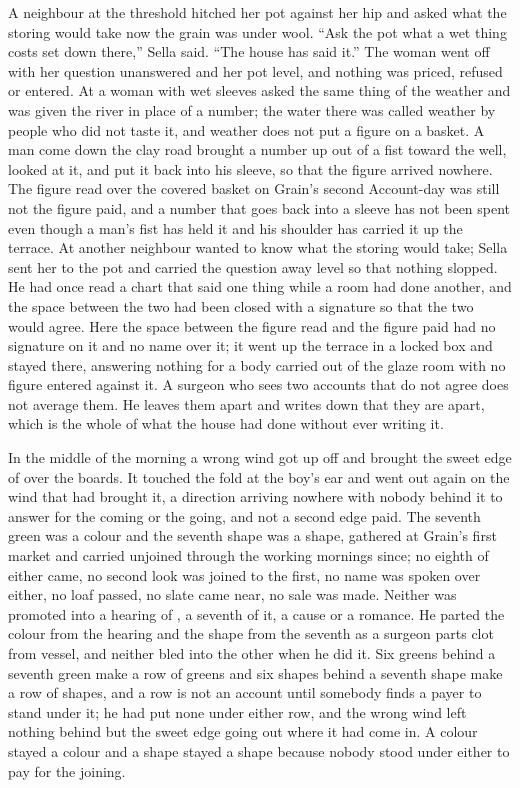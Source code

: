 A neighbour at the threshold hitched her pot against her hip and asked what the storing would take now the grain was under wool. “Ask the pot what a wet thing costs set down there,” Sella said. “The house has said it.” The woman went off with her question unanswered and her pot level, and nothing was priced, refused or entered. At  a woman with wet sleeves asked the same thing of the weather and was given the river in place of a number; the water there was called weather by people who did not taste it, and weather does not put a figure on a basket. A man come down the clay road brought a number up out of a fist toward the well, looked at it, and put it back into his sleeve, so that the figure arrived nowhere. The figure read over the covered basket on Grain's second Account-day was still not the figure paid, and a number that goes back into a sleeve has not been spent even though a man's fist has held it and his shoulder has carried it up the terrace. At  another neighbour wanted to know what the storing would take; Sella sent her to the pot and carried the question away level so that nothing slopped. He had once read a chart that said one thing while a room had done another, and the space between the two had been closed with a signature so that the two would agree. Here the space between the figure read and the figure paid had no signature on it and no name over it; it went up the terrace in a locked box and stayed there, answering nothing for a body carried out of the glaze room with no figure entered against it. A surgeon who sees two accounts that do not agree does not average them. He leaves them apart and writes down that they are apart, which is the whole of what the house had done without ever writing it.

In the middle of the morning a wrong wind got up off  and brought the sweet edge of  over the boards. It touched the fold at the boy's ear and went out again on the wind that had brought it, a direction arriving nowhere with nobody behind it to answer for the coming or the going, and not a second edge paid. The seventh green was a colour and the seventh shape was a shape, gathered at Grain's first market and carried unjoined through the working mornings since; no eighth of either came, no second look was joined to the first, no name was spoken over either, no loaf passed, no slate came near, no sale was made. Neither was promoted into a hearing of , a seventh of it, a cause or a romance. He parted the colour from the hearing and the shape from the seventh as a surgeon parts clot from vessel, and neither bled into the other when he did it. Six greens behind a seventh green make a row of greens and six shapes behind a seventh shape make a row of shapes, and a row is not an account until somebody finds a payer to stand under it; he had put none under either row, and the wrong wind left nothing behind but the sweet edge going out where it had come in. A colour stayed a colour and a shape stayed a shape because nobody stood under either to pay for the joining.

